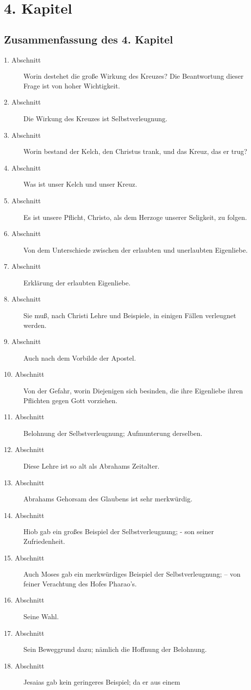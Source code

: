 
\chapter{4. Kapitel}
\section{Zusammenfassung des 4. Kapitel}
\footnotesize
\begin{description}
\item[1. Abschnitt] Worin destehet die große Wirkung des Kreuzes? Die
Beantwortung dieser Frage ist von hoher Wichtigkeit.
\item[2. Abschnitt] Die Wirkung des Kreuzes ist Selbstverleugnung.
\item[3. Abschnitt] Worin bestand der Kelch, den Christus trank, und das Kreuz,
das er trug?
\item[4. Abschnitt]  Was ist unser Kelch und unser Kreuz.
\item[5. Abschnitt] Es ist unsere Pflicht, Christo, als dem Herzoge unserer
Seligkeit, zu folgen.
\item[6. Abschnitt] Von dem Unterschiede zwischen der erlaubten und unerlaubten
Eigenliebe.
\item[7. Abschnitt] Erklärung der erlaubten Eigenliebe.
\item[8. Abschnitt] Sie muß, nach Christi Lehre und Beispiele, in einigen Fällen
verleugnet werden.
\item[9. Abschnitt] Auch nach dem Vorbilde der Apostel.
\item[10. Abschnitt] Von der Gefahr, worin Diejenigen sich besinden, die ihre
Eigenliebe ihren Pflichten gegen Gott vorziehen.
\item[11. Abschnitt] Belohnung der Selbstverleugnung; Aufmunterung derselben.
\item[12. Abschnitt] Diese Lehre ist so alt als Abrahams Zeitalter.
\item[13. Abschnitt] Abrahams Gehorsam des Glaubens ist sehr merkwürdig.
\item[14. Abschnitt] Hiob gab ein großes Beispiel der Selbstverleugnung; - son
seiner Zufriedenheit.
\item[15. Abschnitt] Auch Moses gab ein merkwürdiges Beispiel der
Selbstverleugnung; -- von feiner Verachtung des Hofes Pharao's.
\item[16. Abschnitt] Seine Wahl.
\item[17. Abschnitt] Sein Beweggrund dazu; nämlich die Hoffnung der Belohnung.
\item[18. Abschnitt] Jesaias gab kein geringeres Beispiel; da er aus einem

\end{description}

